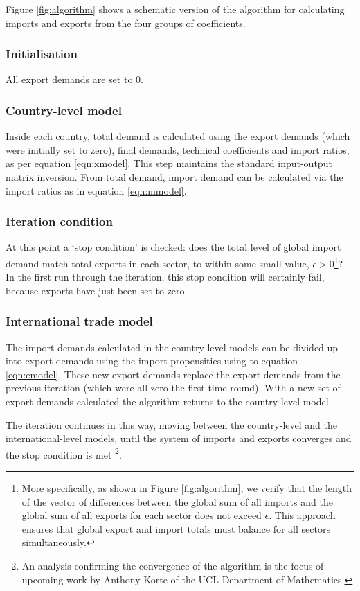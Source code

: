\documentclass[a4paper]{article}
\begin{document}
Figure \ref{fig:algorithm} shows a schematic version of the algorithm for calculating imports and exports from the four groups of coefficients.
\subsubsection*{Initialisation}
All export demands are set to 0.

\subsubsection*{Country-level model}
Inside each country, total demand is calculated using the export demands (which were initially set to zero), final demands, technical coefficients and import ratios, as per equation \eqref{eqn:xmodel}.
This step maintains the standard input-output matrix inversion.
From total demand, import demand can be calculated via the import ratios as in equation \eqref{eqn:mmodel}.

\subsubsection*{Iteration condition}
At this point a `stop condition' is checked: does the total level of global import demand match total exports in each sector, to within some small value,  $\epsilon > 0$\footnote{More specifically, as shown in Figure \ref{fig:algorithm}, we verify that the length of the vector of differences between the global sum of all imports and the global sum of all exports for each sector does not exceed $\epsilon$. This approach ensures that global export and import totals must balance for all sectors simultaneously.}?
In the first run through the iteration, this stop condition will certainly fail, because exports have just been set to zero.

\subsubsection*{International trade model}
The import demands calculated in the country-level models can be divided up into export demands using the import propensities using to equation \eqref{eqn:emodel}.
These new export demands replace the export demands from the previous iteration (which were all zero the first time round).
With a new set of export demands calculated the algorithm returns to the country-level model.

The iteration continues in this way, moving between the country-level and the international-level models, until the system of imports and exports converges and the stop condition is met \footnote{An analysis confirming the convergence of the algorithm is the focus of upcoming work by Anthony Korte of the UCL Department of Mathematics.}.
\end{document}
